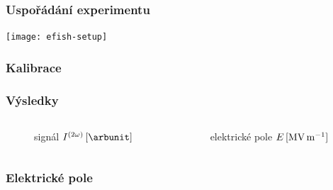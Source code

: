 \documentclass[10pt]{beamer}
\begin{document}
\begin{frame}
	\frametitle{Uspořádání experimentu}
	\texttt{[image: efish-setup]}
\end{frame}

\begin{frame}
	\frametitle{Kalibrace}
	
\end{frame}

\begin{frame}
	\frametitle{Výsledky}
	\begin{columns}
	\begin{column}{0.5\textwidth}
		\begin{figure}
			\centering
			\small
			signál \EFISH{} $\efish\,[\si{\arbunit}]$
			\medskip\par
			
		\end{figure}
	\end{column}
	\begin{column}{0.5\textwidth}
		\begin{figure}
			\centering
			\small
			elektrické pole $E\,[\si{\mega\volt\per\metre}]$
			\medskip\par
			
		\end{figure}
	\end{column}
	\end{columns}
\end{frame}

\begin{frame}
	\frametitle{Elektrické pole}
	\begin{figure}
		\centering
		
	\end{figure}
\end{frame}
\end{document}
